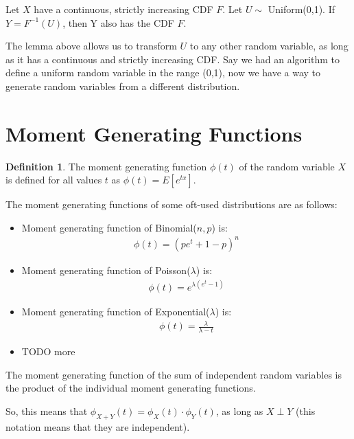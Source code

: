 \documentclass[12pt,letterpaper]{amsbook}
\theoremstyle{definition}
\newtheorem{definition}{Definition}%
\begin{document}
\begin{lemma}
  Let $X$ have a continuous, strictly increasing CDF $F$. Let $U \sim $ Uniform(0,1). If $Y = F^{-1}(U)$, then Y also has the CDF $F$. 
\end{lemma}

The lemma above allows us to transform $U$ to any other random variable, as long as it has a continuous and strictly increasing CDF. Say we had an algorithm to define a uniform random variable in the range (0,1), now we have a way to generate random variables from a different distribution.

\section{Moment Generating Functions}

\begin{definition}
  The moment generating function $\phi(t)$ of the random variable $X$ is defined for all values $t$ as $\phi(t) = E[e^{tx}]$.
\end{definition}

The moment generating functions of some oft-used distributions are as follows:

\begin{itemize}
  \item Moment generating function of Binomial($n,p$) is:
    \begin{align*}
      \phi(t) = (pe^t + 1 - p)^n
    \end{align*}
  \item Moment generating function of Poisson($\lambda$) is:
    \begin{align*}
      \phi(t) = e^{\lambda(e^t-1)}
    \end{align*}
  \item Moment generating function of Exponential($\lambda$) is:
    \begin{align*}
      \phi(t) = \frac{\lambda}{\lambda-t}
    \end{align*}
  \item TODO more
\end{itemize}

\begin{theorem}
  The moment generating function of the sum of independent random variables is the product of the individual moment generating functions.
\end{theorem}

So, this means that $\phi_{X+Y}(t) = \phi_X(t) \cdot \phi_Y(t)$, as long as $X \perp Y$ (this notation means that they are independent).
\end{document}
